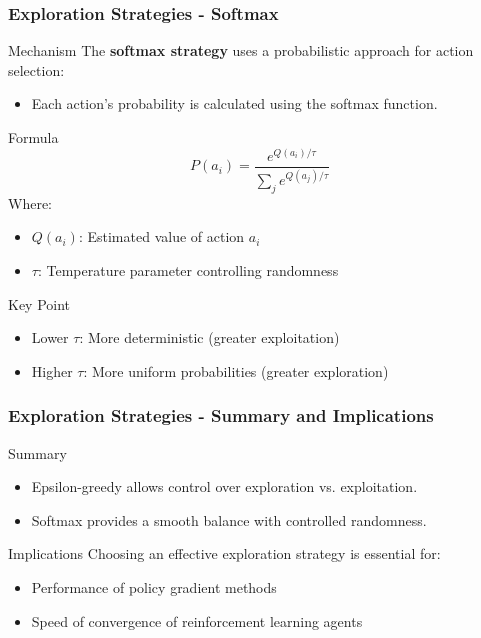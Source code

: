 \documentclass[aspectratio=169]{beamer}
\begin{document}
\begin{frame}[fragile]
    \frametitle{Exploration Strategies - Softmax}
    \begin{block}{Mechanism}
        The \textbf{softmax strategy} uses a probabilistic approach for action selection:
        \begin{itemize}
            \item Each action's probability is calculated using the softmax function.
        \end{itemize}
    \end{block}
    \begin{block}{Formula}
        \begin{equation}
            P(a_i) = \frac{e^{Q(a_i)/\tau}}{\sum_{j} e^{Q(a_j)/\tau}}
        \end{equation}
        Where:
        \begin{itemize}
            \item $Q(a_i)$: Estimated value of action $a_i$
            \item $\tau$: Temperature parameter controlling randomness
        \end{itemize}
    \end{block}
    \begin{block}{Key Point}
        \begin{itemize}
            \item Lower $\tau$: More deterministic (greater exploitation)
            \item Higher $\tau$: More uniform probabilities (greater exploration)   
        \end{itemize}
    \end{block}
\end{frame}

\begin{frame}[fragile]
    \frametitle{Exploration Strategies - Summary and Implications}
    \begin{block}{Summary}
        \begin{itemize}
            \item Epsilon-greedy allows control over exploration vs. exploitation.
            \item Softmax provides a smooth balance with controlled randomness.
        \end{itemize}
    \end{block}
    \begin{block}{Implications}
        Choosing an effective exploration strategy is essential for:
        \begin{itemize}
            \item Performance of policy gradient methods
            \item Speed of convergence of reinforcement learning agents
        \end{itemize}
    \end{block}
\end{frame}
\end{document}
